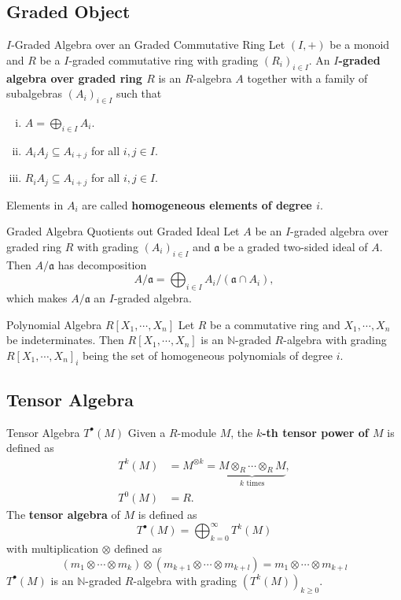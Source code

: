 \subsection{Graded Object}

\begin{definition}{$I$-Graded Algebra over an Graded Commutative Ring}{}
    Let $(I,+)$ be a monoid and $R$ be a $I$-graded commutative ring with grading $(R_i)_{i\in I}$. An \textbf{$I$-graded algebra over graded ring $R$} is an $R$-algebra $A$ together with a family of subalgebras $\left(A_i\right)_{i\in I}$ such that
    \begin{enumerate}[(i)]
        \item $A=\bigoplus_{i\in I}A_i$.
        \item $A_iA_j\subseteq A_{i+j}$ for all $i, j\in I$.
        \item $R_iA_j\subseteq A_{i+j}$ for all $i, j\in I$.
    \end{enumerate}
    Elements in $A_i$ are called \textbf{homogeneous elements of degree $i$}.
\end{definition}


\begin{proposition}{Graded Algebra Quotients out Graded Ideal}{}
    Let $A$ be an $I$-graded algebra over graded ring $R$ with grading $(A_i)_{i\in I}$ and $\mathfrak{a}$ be a graded two-sided ideal of $A$. Then $A/\mathfrak{a}$ has decomposition
    \[
    A/ \mathfrak{a}=\bigoplus_{i\in I}A_i/\left(\mathfrak{a}\cap A_i\right),    
    \]
    which makes $A/\mathfrak{a}$ an $I$-graded algebra.
\end{proposition}



\begin{example}{Polynomial Algebra $R[X_1,\cdots,X_n]$}{}
    Let $R$ be a commutative ring and $X_1,\cdots,X_n$ be indeterminates. Then $R[X_1,\cdots,X_n]$ is an $\mathbb{N}$-graded $R$-algebra with grading $R[X_1,\cdots,X_n]_i$ being the set of homogeneous polynomials of degree $i$.
\end{example}



\subsection{Tensor Algebra}
\begin{definition}{Tensor Algebra $T^{\bullet}(M)$}{}
    Given a $R$-module $M$, the \textbf{$k$-th tensor power of $M$} is defined as
    \begin{align*}
        T^k(M)&=M^{\otimes k}=\underbrace{M\otimes_R\cdots\otimes_R M}_{k\text{ times}},\\
        T^0(M)&=R.
    \end{align*}
    The \textbf{tensor algebra} of $M$ is defined as
    \[
        T^{\bullet}(M)=\bigoplus_{k=0}^{\infty}T^k(M)
    \]
    with multiplication $\otimes$ defined as
    \[
        (m_1\otimes\cdots\otimes m_k)\otimes(m_{k+1}\otimes\cdots\otimes m_{k+l})=m_1\otimes\cdots\otimes m_{k+l}
    \]
    $T^{\bullet}(M)$ is an $\mathbb{N}$-graded $R$-algebra with grading $(T^k(M))_{k\ge 0}$.
\end{definition}


